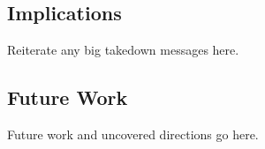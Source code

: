 \subsection{Implications}
Reiterate any big takedown messages here. 

\subsection{Future Work}
Future work and uncovered directions go here.
